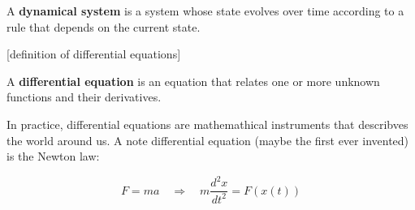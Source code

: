\begin{definitionblock}
A \textbf{dynamical system} is a system whose state evolves over time according to a rule that depends on the current state.
\end{definitionblock}

[definition of differential equations]

\begin{definitionblock}
    A \textbf{differential equation} is an equation that relates one or more unknown functions and their derivatives.
\end{definitionblock}

In practice, differential equations are mathemathical instruments that describves the world around us. A note differential equation (maybe the first ever invented) is the Newton law:

$$
F = ma \quad \Rightarrow \quad m \frac{d^2x}{dt^2} = F(x(t))
$$

\cleardoublepage
